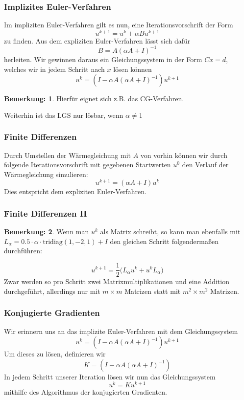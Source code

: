 \documentclass[xcolor = dvipsnames, notheorems, 10pt]{beamer}
\newcommand{\vth}{\vspace{4pt}}
\theoremstyle{definition}
\newtheorem{remark}		{Bemerkung:\vth}
\begin{document}
\begin{frame}
\frametitle{Implizites Euler-Verfahren}
	Im impliziten Euler-Verfahren gilt es nun, eine Iterationsvorschrift der Form
	$$ u^{k+1} = u^k + \alpha Bu^{k+1} $$
	zu finden.
	Aus dem expliziten Euler-Verfahren lässt sich dafür
	$$ B = A (\alpha A + I)^{-1} $$
	herleiten.
	Wir gewinnen daraus ein Gleichungssystem in der Form $Cx = d$, welches wir in jedem Schritt nach $x$ lösen können
	$$ u^k = (I - \alpha A (\alpha A + I)^{-1}) u^{k+1} $$
	\begin{remark}
		Hierfür eignet sich z.B. das CG-Verfahren.

		Weiterhin ist das LGS nur lösbar, wenn $\alpha \neq 1$
	\end{remark}

\end{frame}

\begin{frame}
\frametitle{Finite Differenzen}
	Durch Umstellen der Wärmegleichung mit $A$ von vorhin können wir durch folgende Iterationsvorschrift mit gegebenen Startwerten $u^0$ den Verlauf der Wärmegleichung simulieren:
	$$u^{k+1} = (\alpha A+I)u^k$$
	Dies entspricht dem expliziten Euler-Verfahren.
\end{frame}

\begin{frame}
\frametitle{Finite Differenzen II}
	\begin{remark}
		Wenn man $u^k$ als Matrix schreibt, so kann man ebenfalls mit $L_\alpha = 0.5 \cdot \alpha \cdot \text{tridiag}(1,-2,1) + I$ den gleichen Schritt folgendermaßen durchführen:

		$$u^{k+1} = \frac{1}{2} \big( L_\alpha u^k + u^kL_\alpha \big)$$
		Zwar werden so pro Schritt zwei Matrixmultiplikationen und eine Addition durchgeführt, allerdings nur mit $m \times m$ Matrizen statt mit $m^2 \times m^2$ Matrizen.
	\end{remark}
\end{frame}


\begin{frame}
\frametitle{Konjugierte Gradienten}
	Wir erinnern uns an das implizite Euler-Verfahren mit dem Gleichungssystem 
		$$ u^k = (I - \alpha A (\alpha A + I)^{-1}) u^{k+1} $$
	Um dieses zu lösen, definieren wir 
		$$ K = (I - \alpha A (\alpha A + I)^{-1})$$
	In jedem Schritt unserer Iteration lösen wir nun das Gleichungssystem
		$$ u^k = Ku^{k+1}$$
	mithilfe des Algorithmus der konjugierten Gradienten.

\end{frame}
\end{document}

